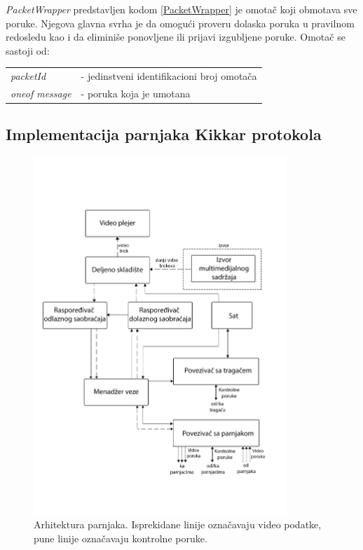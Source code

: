 \documentclass[12pt,oneside]{memoir}
\begin{document}


\textit{PacketWrapper} predstavljen kodom \ref{PacketWrapper} je omotač koji obmotava sve poruke. Njegova glavna svrha je da omogući proveru dolaska poruka u pravilnom redosledu kao i da eliminiše ponovljene ili prijavi izgubljene poruke. Omotač se sastoji od:
 
\begin{center}
\begin{tabular}{ p{4cm} p{10cm} }
 \textit{packetId} & - jedinstveni identifikacioni broj omotača \\ 
 \textit{oneof message} & - poruka koja je umotana \\ 
\end{tabular}
\end{center}


\subsection{Implementacija parnjaka Kikkar protokola}
\label{implementacija.2.3}

\begin{figure}[!ht]
  \centering
  \includegraphics[width=0.85\textwidth]{slike/arhitektura-sistema.png}
  \caption{Arhitektura parnjaka. Isprekidane linije označavaju video podatke, pune linije označavaju kontrolne poruke.}
  \label{fig:arhitektura}
\end{figure}
\par
\end{document}
